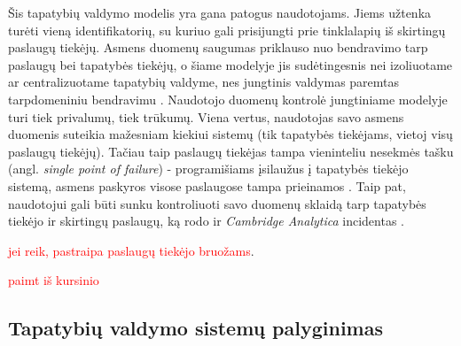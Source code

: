 Šis tapatybių valdymo modelis yra gana patogus naudotojams. Jiems užtenka turėti vieną identifikatorių, su kuriuo
gali prisijungti prie tinklalapių iš skirtingų paslaugų tiekėjų. Asmens duomenų saugumas priklauso nuo
bendravimo tarp paslaugų bei tapatybės tiekėjų, o šiame modelyje jis sudėtingesnis nei izoliuotame ar centralizuotame
tapatybių valdyme, nes jungtinis valdymas paremtas tarpdomeniniu bendravimu \cite{Maler2008}. Naudotojo duomenų kontrolė jungtiniame 
modelyje turi tiek privalumų, tiek trūkumų. Viena vertus, naudotojas savo asmens duomenis suteikia mažesniam kiekiui sistemų (tik tapatybės tiekėjams,
vietoj visų paslaugų tiekėjų). Tačiau taip paslaugų tiekėjas tampa vieninteliu nesekmės tašku (angl. \textit{single point of failure}) - programišiams įsilaužus
į tapatybės tiekėjo sistemą, asmens paskyros visose paslaugose tampa prieinamos \cite{Pashalidis2003}. Taip pat, naudotojui gali būti sunku kontroliuoti
savo duomenų sklaidą tarp tapatybės tiekėjo ir skirtingų paslaugų, ką rodo ir \textit{Cambridge Analytica} incidentas \cite{CambridgeAnalytica}.

\textcolor{red}{jei reik, pastraipa paslaugų tiekėjo bruožams}.


\textcolor{red}{paimt iš kursinio}

\subsection{Tapatybių valdymo sistemų palyginimas}

